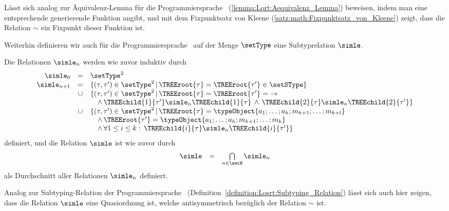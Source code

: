 \begin{beweis}
  L\"asst sich analog zur \"Aquivalenz-Lemma f\"ur die Programmiersprache \Lort\ (\ref{lemma:Lort:Aequivalenz_Lemma})
  beweisen, indem man eine entsprechende generierende Funktion angibt, und mit dem Fixpunktsatz von Kleene
  (\ref{satz:math:Fixpunktsatz_von_Kleene}) zeigt, dass die Relation $\sim$ ein Fixpunkt dieser Funktion ist.
\end{beweis}

Weiterhin definieren wir auch f\"ur die Programmiersprache \Lct\ auf der Menge $\setType$ eine Subtyprelation $\simle$.

\begin{definition} \label{definition:Lct:Subtyping_Relation}
  Die Relationen $\simle_n$ werden wie zuvor induktiv durch
  \[\begin{array}{rcl}
    \simle_0     &   =  & \setType^2 \\
    \simle_{n+1} &   =  & \{(\tau,\tau')\in\setType^2\,|\,\TREEroot{\tau} = \TREEroot{\tau'} \in \setSType\} \\
                 & \cup & \{(\tau,\tau')\in\setType^2\,|\,\TREEroot{\tau} = \TREEroot{\tau'} =\ \to \\
                 &      & \quad \wedge\,\TREEchild{1}{\tau'} \simle_n \TREEchild{1}{\tau}
                              \,\wedge\,\TREEchild{2}{\tau} \simle_n \TREEchild{2}{\tau'}\} \\
                 & \cup & \{(\tau,\tau')\in\setType^2\,|\,\TREEroot{\tau} = \typeObject{a_1;\ldots;a_h;m_{h+1};\ldots;m_{k+l}} \\
                 &      & \quad \wedge\,\TREEroot{\tau'} = \typeObject{a_1;\ldots;a_h;m_{h+1};\ldots;m_k} \\
                 &      & \quad \wedge\,\forall 1 \le i \le k:\,\TREEchild{i}{\tau} \simle_n \TREEchild{i}{\tau'}\}
  \end{array}\]
  definiert, und die Relation $\simle$ ist wie zuvor durch
  \[\begin{array}{rcl}
    \simle & = & \bigcap\limits_{n\in\setN} \simle_n
  \end{array}\]
  als Durchschnitt aller Relationen $\simle_n$ definiert.
\end{definition}

Analog zur Subtyping-Relation der Programmiersprache \Losrt\ (Definition~\ref{definition:Losrt:Subtyping_Relation}) l\"asst
sich auch hier zeigen, dass die Relation $\simle$ eine Quasiordnung ist, welche antisymmetrisch bez\"uglich der Relation $\sim$
ist.

